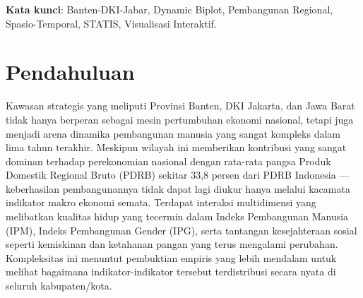 \documentclass[a4paper]{article}
\theoremstyle{definition} %
\begin{document}
\bigskip

\noindent\textbf{Kata kunci}: Banten-DKI-Jabar, Dynamic Biplot, Pembangunan Regional, Spasio-Temporal, STATIS, Visualisasi Interaktif.

\newpage
\section{Pendahuluan}
Kawasan strategis yang meliputi Provinsi Banten, DKI Jakarta, dan Jawa Barat tidak hanya berperan sebagai mesin pertumbuhan ekonomi nasional, tetapi juga menjadi arena dinamika pembangunan manusia yang sangat kompleks dalam lima tahun terakhir. Meskipun wilayah ini memberikan kontribusi yang sangat dominan terhadap perekonomian nasional dengan rata-rata pangsa Produk Domestik Regional Bruto (PDRB) sekitar 33,8 persen dari PDRB Indonesia \citet{bpspdrb}---keberhasilan pembangunannya tidak dapat lagi diukur hanya melalui kacamata indikator makro ekonomi semata. Terdapat interaksi multidimensi yang melibatkan kualitas hidup yang tecermin dalam Indeks Pembangunan Manusia (IPM), Indeks Pembangunan Gender (IPG), serta tantangan kesejahteraan sosial seperti kemiskinan dan ketahanan pangan yang terus mengalami perubahan. Kompleksitas ini menuntut pembuktian empiris yang lebih mendalam untuk melihat bagaimana indikator-indikator tersebut terdistribusi secara nyata di seluruh kabupaten/kota.
\end{document}
